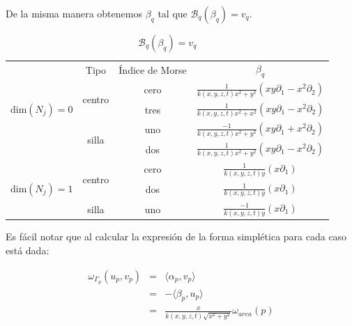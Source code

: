 \documentclass[a4paper,10pt]{book}
\begin{document}
De la misma manera obtenemos $\beta_{q}$ tal que $\mathcal{B}_{q}(\beta_{q})=v_{q}$.\\

\begin{table}[!ht]
\centering
\begin{tabular}{|c|c|c|c|}
\hline
\multirow{5}{*}{dim$(N_{j})=0$} & Tipo                    & \multicolumn{1}{l|}{\'Indice de Morse} & $\beta_{q}$                                                                                          \\ \cline{2-4} 
                                & \multirow{2}{*}{centro} & cero                             & $\frac{1}{k(x,y,z,t)x^{2}+y^{2}}(xy\partial_{1}-x^{2}\partial_{2})$  \\ \cline{3-4} 
                                &                         & tres                            & $\frac{1}{k(x,y,z,t)x^{2}+x^{2}}(xy\partial_{1}-x^{2}\partial_{2})$  \\ \cline{2-4} 
                                & \multirow{2}{*}{silla} & uno                              & $\frac{-1}{k(x,y,z,t)x^{2}+y^{2}}(xy\partial_{1}+x^{2}\partial_{2})$ \\ \cline{3-4} 
                                &                         & dos                              & $\frac{1}{k(x,y,z,t)x^{2}+y^{2}}(xy\partial_{1}-x^{2}\partial_{2})$  \\ \hline
\multirow{3}{*}{dim$(N_{j})=1$} & \multirow{2}{*}{centro} & cero                             & $\frac{1}{k(x,y,z,t)y}(x\partial_{1})$                                        \\ \cline{3-4} 
                                &                         & dos                             & $\frac{1}{k(x,y,z,t)y}(x\partial_{1})$                                        \\ \cline{2-4} 
                                & silla                  & uno                              & $\frac{-1}{k(x,y,z,t)y}(x\partial_{1})$                                       \\ \hline
\end{tabular}
\caption{$\mathcal{B}_{q}(\beta_{q})=v_{q}$}
\label{tabla9}
\end{table}

Es f\'acil notar que al calcular la expresi\'on de la forma simpl\'etica para cada caso est\'a dada: 

\begin{eqnarray*}
\omega_{\Gamma_{p}}(u_{p},v_{p}) & = &  \langle \alpha_{p} , v_{p} \rangle \\
                                 & = & -\langle \beta_{p} , u_{p} \rangle \\
                                 & = & \frac{x}{k(x,y,z,t)\sqrt{x^{2}+y^{2}}}\omega_{area}(p)  
\end{eqnarray*}
\end{document}
